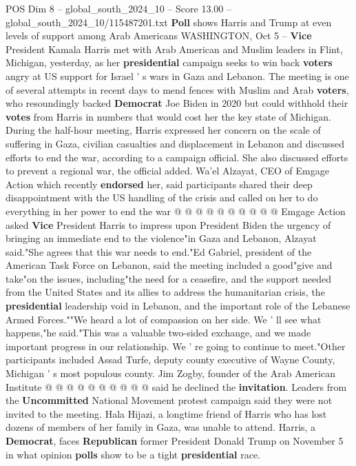 \begin{textsample}{POS Dim 8 – global\_south\_2024\_10 – Score 13.00 – global\_south\_2024\_10/115487201.txt}  \label{ex:f8_pos_260}
\textbf{Poll} shows Harris and Trump at even levels of support among Arab Americans WASHINGTON, Oct 5 -- \textbf{Vice} President Kamala Harris met with Arab American and Muslim leaders in Flint, Michigan, yesterday, as her \textbf{presidential} campaign seeks to win back \textbf{voters} angry at US support for Israel ' s wars in Gaza and Lebanon.
The meeting is one of several attempts in recent days to mend fences with Muslim and Arab \textbf{voters}, who resoundingly backed \textbf{Democrat} Joe Biden in 2020 but could withhold their \textbf{votes} from Harris in numbers that would cost her the key state of Michigan.
During the half-hour meeting, Harris expressed her concern on the scale of suffering in Gaza, civilian casualties and displacement in Lebanon and discussed efforts to end the war, according to a campaign official.
She also discussed efforts to prevent a regional war, the official added.
Wa'el Alzayat, CEO of Emgage Action which recently \textbf{endorsed} her, said participants shared their deep disappointment with the US handling of the crisis and called on her to do everything in her power to end the war @ @ @ @ @ @ @ @ @ @ Emgage Action asked \textbf{Vice} President Harris to impress upon President Biden the urgency of bringing an immediate end to the violence"in Gaza and Lebanon, Alzayat said."She agrees that this war needs to end."Ed Gabriel, president of the American Task Force on Lebanon, said the meeting included a good"give and take"on the issues, including"the need for a ceasefire, and the support needed from the United States and its allies to address the humanitarian crisis, the \textbf{presidential} leadership void in Lebanon, and the important role of the Lebanese Armed Forces.""We heard a lot of compassion on her side.
We ' ll see what happens,"he said."This was a valuable two-sided exchange, and we made important progress in our relationship.
We ' re going to continue to meet."Other participants included Assad Turfe, deputy county executive of Wayne County, Michigan ' s most populous county.
Jim Zogby, founder of the Arab American Institute @ @ @ @ @ @ @ @ @ @ said he declined the \textbf{invitation}.
Leaders from the \textbf{Uncommitted} National Movement protest campaign said they were not invited to the meeting.
Hala Hijazi, a longtime friend of Harris who has lost dozens of members of her family in Gaza, was unable to attend.
Harris, a \textbf{Democrat}, faces \textbf{Republican} former President Donald Trump on November 5 in what opinion \textbf{polls} show to be a tight \textbf{presidential} race.

\end{textsample}
